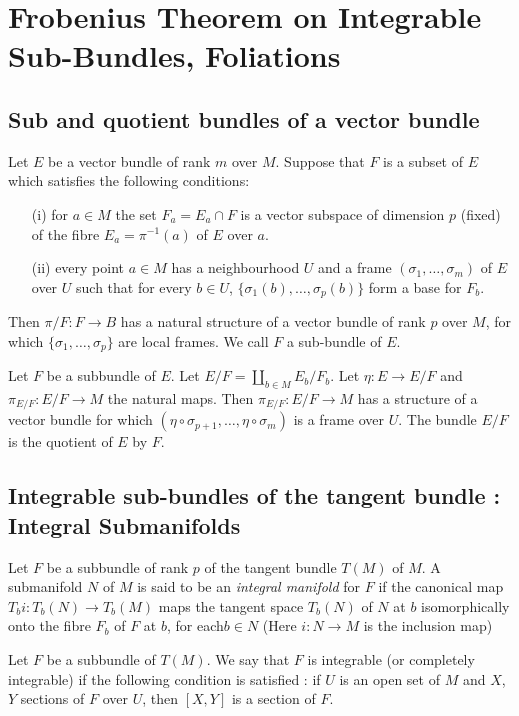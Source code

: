 \chapter{Frobenius Theorem on Integrable Sub-Bundles, Foliations}\label{chap8}

\section*{Sub and quotient bundles of a vector bundle}\pageoriginale

Let $E$ be a vector bundle of rank $m$ over $M$. Suppose that $F$ is a subset of $E$ which satisfies the following conditions:
\begin{itemize}
\item[(i)] for $a\in M$ the set $F_{a}=E_{a}\cap F$ is a vector subspace of dimension $p$ (fixed) of the fibre $E_{a}=\pi^{-1}(a)$ of $E$ over $a$.

\item[(ii)] every point $a\in M$ has a neighbourhood $U$ and a frame $(\sigma_{1},\ldots,\sigma_{m})$ of $E$ over $U$ such that for every $b\in U$, $\{\sigma_{1}(b),\ldots,\sigma_{p}(b)\}$ form a base for $F_{b}$.
\end{itemize}

Then $\pi/F:F\to B$ has a natural structure of a vector bundle of rank $p$ over $M$, for which $\{\sigma_{1},\ldots,\sigma_{p}\}$ are local frames. We call $F$ a sub-bundle of $E$.

Let $F$ be a subbundle of $E$. Let $E/F=\coprod\limits_{b\in M}E_{b}/F_{b}$. Let $\eta:E\to E/F$ and $\pi_{E/F}:E/F\to M$ the natural maps. Then $\pi_{E/F}:E/F\to M$ has a structure of a vector bundle for which $(\eta\circ \sigma_{p+1},\ldots,\eta\circ\sigma_{m})$ is a frame over $U$. The bundle $E/F$ is the quotient of $E$ by $F$.

\section*{Integrable sub-bundles of the tangent bundle : Integral Submanifolds}

Let $F$ be a subbundle of rank $p$ of the tangent bundle $T(M)$ of $M$. A submanifold $N$ of $M$ is said to be an {\em integral manifold} for $F$ if the canonical map $T_{b}i:T_{b}(N)\to T_{b}(M)$ maps the tangent space $T_{b}(N)$ of $N$ at $b$ isomorphically onto the fibre $F_{b}$ of $F$ at $b$, for each\pageoriginale $b\in N$ (Here $i:N\to M$ is the inclusion map)

\begin{defi*}
Let $F$ be a subbundle of $T(M)$. We say that $F$ is integrable (or completely integrable) if the following condition is satisfied : if $U$ is an open set of $M$ and $X$, $Y$ sections of $F$ over $U$, then $[X,Y]$ is a section of $F$.
\end{defi*}

